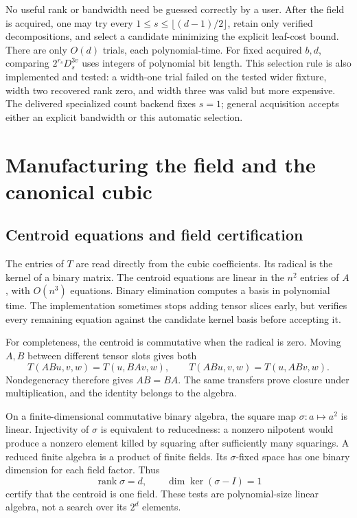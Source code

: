 \documentclass[11pt]{article}
\theoremstyle{remark}\newtheorem{remark}[theorem]{Remark}
\newcommand{\rank}{\operatorname{rank}}
\begin{document}
No useful rank or bandwidth need be guessed correctly by a user. After the field is acquired, one may try every $1\le s\le\lfloor(d-1)/2\rfloor$, retain only verified decompositions, and select a candidate minimizing the explicit leaf-cost bound. There are only $O(d)$ trials, each polynomial-time. For fixed acquired $b,d$, comparing $2^{r_s}D_s^{3v}$ uses integers of polynomial bit length. This selection rule is also implemented and tested: a width-one trial failed on the tested wider fixture, width two recovered rank zero, and width three was valid but more expensive. The delivered specialized count backend fixes $s=1$; general acquisition accepts either an explicit bandwidth or this automatic selection.

\section{Manufacturing the field and the canonical cubic}
\subsection{Centroid equations and field certification}
The entries of $T$ are read directly from the cubic coefficients. Its radical is the kernel of a binary matrix. The centroid equations are linear in the $n^2$ entries of $A$, with $O(n^3)$ equations. Binary elimination computes a basis in polynomial time. The implementation sometimes stops adding tensor slices early, but verifies every remaining equation against the candidate kernel basis before accepting it.

For completeness, the centroid is commutative when the radical is zero. Moving $A,B$ between different tensor slots gives both
\[
 T(ABu,v,w)=T(u,BAv,w),\qquad
 T(ABu,v,w)=T(u,ABv,w).
\]
Nondegeneracy therefore gives $AB=BA$. The same transfers prove closure under multiplication, and the identity belongs to the algebra.

On a finite-dimensional commutative binary algebra, the square map $\sigma:a\mapsto a^2$ is linear. Injectivity of $\sigma$ is equivalent to reducedness: a nonzero nilpotent would produce a nonzero element killed by squaring after sufficiently many squarings. A reduced finite algebra is a product of finite fields. Its $\sigma$-fixed space has one binary dimension for each field factor. Thus
\[
 \rank\sigma=d,\qquad \dim\ker(\sigma-I)=1
\]
certify that the centroid is one field. These tests are polynomial-size linear algebra, not a search over its $2^d$ elements.
\end{document}
